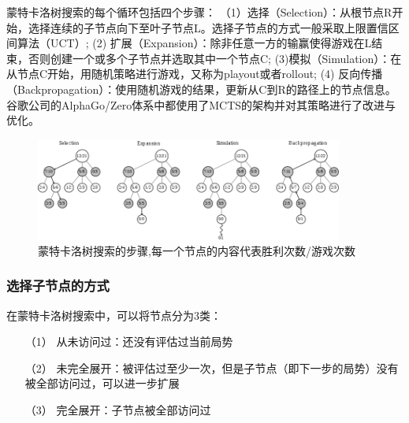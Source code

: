 蒙特卡洛树搜索的每个循环包括四个步骤\cite{RePEc:wsi:nmncxx:v:04:y:2008:i:03:n:s1793005708001094}：
（1）选择（Selection）：从根节点R开始，选择连续的子节点向下至叶子节点L。选择子节点的方式一般采取上限置信区间算法（UCT）\cite{10.1007/11871842_29};
(2) 扩展（Expansion）：除非任意一方的输赢使得游戏在L结束，否则创建一个或多个子节点并选取其中一个节点C;
(3)模拟（Simulation）：在从节点C开始，用随机策略进行游戏，又称为playout或者rollout;
(4) 反向传播（Backpropagation）：使用随机游戏的结果，更新从C到R的路径上的节点信息。
谷歌公司的AlphaGo/Zero体系中都使用了MCTS的架构并对其策略进行了改进与优化。

\begin{figure}[htb]
    \centering
    \includegraphics[width=0.9\textwidth]{mctswiki.png}
    \caption[mcts]{%
    蒙特卡洛树搜索的步骤,每一个节点的内容代表胜利次数/游戏次数\cite{RePEc:wsi:nmncxx:v:04:y:2008:i:03:n:s1793005708001094}%
      }
    \label{fig:mcts}
  \end{figure}
\newpage

\subsubsection{选择子节点的方式}
在蒙特卡洛树搜索中，可以将节点分为3类：

\begin{itemize}
    \item [（1）] 
    从未访问过：还没有评估过当前局势
    \item [（2）]
    未完全展开：被评估过至少一次，但是子节点（即下一步的局势）没有被全部访问过，可以进一步扩展
    \item [（3）]
    完全展开：子节点被全部访问过
\end{itemize}

